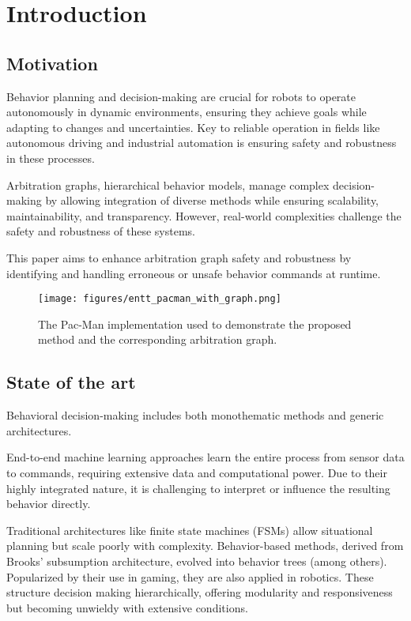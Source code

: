 \section{Introduction}

\subsection{Motivation}

Behavior planning and decision-making are crucial for robots to operate autonomously in dynamic environments, ensuring they achieve goals while adapting to changes and uncertainties.
Key to reliable operation in fields like autonomous driving and industrial automation is ensuring safety and robustness in these processes.

Arbitration graphs, hierarchical behavior models, manage complex decision-making
by allowing integration of diverse methods while ensuring scalability, maintainability, and transparency.
However, real-world complexities challenge the safety and robustness of these systems.

This paper aims to enhance arbitration graph safety and robustness by identifying and handling erroneous or unsafe behavior commands at runtime.

\begin{figure}
    \centering
    \texttt{[image: figures/entt\_pacman\_with\_graph.png]}
    \caption{The Pac-Man implementation used to demonstrate the proposed method and the corresponding arbitration graph.}
    \label{fig:entt-pacman}
\end{figure}

\subsection{State of the art}
Behavioral decision-making includes both monothematic methods and generic architectures.

End-to-end machine learning approaches learn the entire process from sensor data to commands, requiring extensive data and computational power.
Due to their highly integrated nature, it is challenging to interpret or influence the resulting behavior directly.

Traditional architectures like finite state machines (FSMs) allow situational planning but scale poorly with complexity. Behavior-based methods, derived from Brooks' subsumption architecture, evolved into behavior trees (among others). Popularized by their use in gaming, they are also applied in robotics. These structure decision making hierarchically, offering modularity and responsiveness but becoming unwieldy with extensive conditions.

